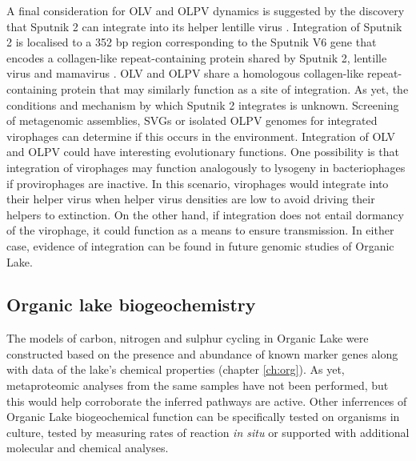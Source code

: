 A final consideration for \ac{OLV} and \ac{OLPV} dynamics is suggested by the discovery that Sputnik 2 can integrate into its helper lentille virus \cite{Desnues2012}.
Integration of Sputnik 2 is localised to a 352 bp region corresponding to the Sputnik V6 gene that encodes a collagen-like repeat-containing protein shared by Sputnik 2, lentille virus and mamavirus  \cite{Desnues2012}. 
\ac{OLV} and \ac{OLPV} share a homologous collagen-like repeat-containing protein that may similarly function as a site of integration.
As yet, the conditions and mechanism by which Sputnik 2 integrates is unknown.
Screening of metagenomic assemblies, \acp{SVG} or isolated \ac{OLPV} genomes for integrated virophages can determine if this occurs in the environment.
Integration of \ac{OLV} and \ac{OLPV} could have interesting evolutionary functions.
One possibility is that integration of virophages may function analogously to lysogeny in bacteriophages if provirophages are inactive.
In this scenario, virophages would integrate into their helper virus when helper virus densities are low to avoid driving their helpers to extinction.
On the other hand, if integration does not entail dormancy of the virophage, it could function as a means to ensure transmission.
In either case, evidence of integration can be found in future genomic studies of Organic Lake.

\subsection{Organic lake biogeochemistry}
The models of carbon, nitrogen and sulphur cycling in Organic Lake were constructed based on the presence and abundance of known marker genes  along with data of the lake's chemical properties (chapter \ref{ch:org}).
As yet, metaproteomic analyses from the same samples have not been performed, but this would help corroborate the inferred pathways are active. 
Other inferrences of Organic Lake biogeochemical function can be specifically tested on organisms in culture, tested by measuring rates of reaction \emph{in situ} or supported with additional molecular and chemical analyses.

